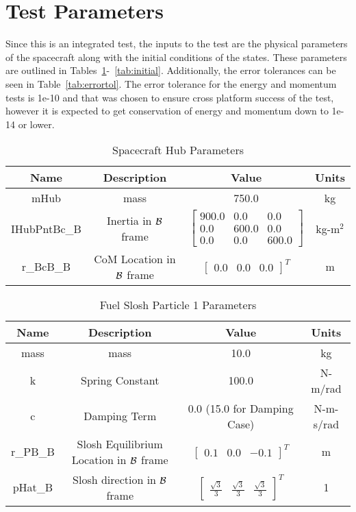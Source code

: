 \section{Test Parameters}

Since this is an integrated test, the inputs to the test are the physical parameters of the spacecraft along with the initial conditions of the states. These parameters are outlined in Tables~\ref{tab:hub}-~\ref{tab:initial}. Additionally, the error tolerances can be seen in Table~\ref{tab:errortol}. The error tolerance for the energy and momentum tests is 1e-10 and that was chosen to ensure cross platform success of the test, however it is expected to get conservation of energy and momentum down to 1e-14 or lower. 

\begin{table}[htbp]
	\caption{Spacecraft Hub Parameters}
	\label{tab:hub}
	\centering \fontsize{10}{10}\selectfont
	\begin{tabular}{| c | c | c | c |} %
		\hline
		\textbf{Name}  & \textbf{Description}  & \textbf{Value} & \textbf{Units} \\
		\hline
		mHub  & mass & 750.0 & kg \\
		\hline
		IHubPntBc\_B & Inertia in $\cal{B}$ frame & $\begin{bmatrix}
		900.0 & 0.0 & 0.0\\
		0.0 & 600.0 & 0.0\\
		0.0 & 0.0 & 600.0
		\end{bmatrix}$ & kg-m$^2$ \\
		\hline
		r\_BcB\_B & CoM Location in $\cal{B}$ frame & $\begin{bmatrix}
		0.0 & 0.0 & 0.0 \end{bmatrix}^T$ & m \\
		\hline
	\end{tabular}
\end{table}

\begin{table}[htbp]
	\caption{Fuel Slosh Particle 1 Parameters}
	\label{tab:slosh1}
	\centering \fontsize{10}{10}\selectfont
	\begin{tabular}{| c | c | c | c |} %
		\hline
		\textbf{Name}  & \textbf{Description}  & \textbf{Value} & \textbf{Units} \\
		\hline
		mass  & mass & 10.0 & kg \\
		\hline
		k & Spring Constant & 100.0 & N-m/rad \\
		\hline
		c & Damping Term & 0.0 (15.0 for Damping Case) & N-m-s/rad \\
		\hline
		r\_PB\_B & Slosh Equilibrium Location in $\cal{B}$ frame & $\begin{bmatrix}
		0.1 & 0.0 & -0.1 \end{bmatrix}^T$ & m \\
		\hline
		pHat\_B & Slosh direction in $\cal{B}$ frame & $\begin{bmatrix}
		\frac{\sqrt{3}}{3} & \frac{\sqrt{3}}{3} & \frac{\sqrt{3}}{3} \end{bmatrix}^T$ & 1 \\
		\hline
	\end{tabular}
\end{table}

